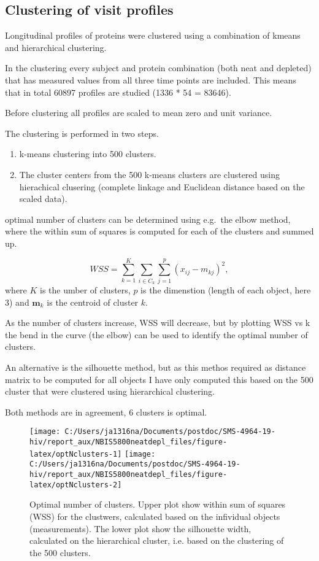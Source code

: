 \documentclass[
]{article}
\providecommand{\tightlist}{%
  \setlength{\itemsep}{0pt}\setlength{\parskip}{0pt}}
\begin{document}
\FloatBarrier

\FloatBarrier

\hypertarget{clustering-of-visit-profiles}{%
\subsection{Clustering of visit profiles}\label{clustering-of-visit-profiles}}

Longitudinal profiles of proteins were clustered using a combination of kmeans and hierarchical clustering.

In the clustering every subject and protein combination (both neat and depleted) that has measured values from all three time points are included. This means that in total 60897 profiles are studied (1336 * 54 = 83646).

Before clustering all profiles are scaled to mean zero and unit variance.

The clustering is performed in two steps.

\begin{enumerate}
\def\labelenumi{\arabic{enumi}.}
\tightlist
\item
  k-means clustering into 500 clusters.
\item
  The cluster centers from the 500 k-means clusters are clustered using hierachical clusering (complete linkage and Euclidean distance based on the scaled data).
\end{enumerate}

optimal number of clusters can be determined using e.g.~the elbow method, where the within sum of squares is computed for each of the clusters and summed up.

\[WSS = \sum_{k=1}^K\sum_{i \in C_k}\sum_{j=1}^p (x_{ij} - m_{kj})^2,\]
where \(K\) is the umber of clusters, \(p\) is the dimenstion (length of each object, here 3) and \(\mathbf{m}_k\) is the centroid of cluster \(k\).

As the number of clusters increase, WSS will decrease, but by plotting WSS vs k the bend in the curve (the elbow) can be used to identify the optimal number of clusters.

An alternative is the silhouette method, but as this methos required as distance matrix to be computed for all objects I have only computed this based on the 500 cluster that were clustered using hierarchical clustering.

Both methods are in agreement, 6 clusters is optimal.

\begin{figure}
\texttt{[image: C:/Users/ja1316na/Documents/postdoc/SMS-4964-19-hiv/report\_aux/NBIS5800neatdepl\_files/figure-latex/optNclusters-1]} \texttt{[image: C:/Users/ja1316na/Documents/postdoc/SMS-4964-19-hiv/report\_aux/NBIS5800neatdepl\_files/figure-latex/optNclusters-2]} \caption{Optimal number of clusters. Upper plot show within sum of squares (WSS) for the clustwers, calculated based on the infividual objects (measurements). The lower plot show the silhouette width, calculated on the hierarchical cluster, i.e. based on the clustering of the 500 clusters.}\label{fig:optNclusters}
\end{figure}
\end{document}
